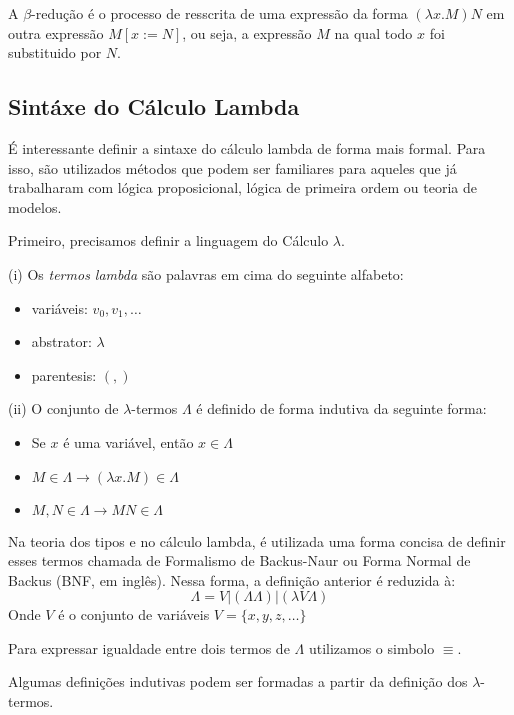 \documentclass[../main.tex]{subfiles}
\begin{document}
\begin{definition}
    A $\beta$-redução é o processo de resscrita de uma expressão da forma $(\lambda x . M)N$ em outra expressão $M[x := N]$, ou seja, a expressão $M$ na qual todo $x$ foi substituido por $N$.    
\end{definition}

\subsection{Sintáxe do Cálculo Lambda}

É interessante definir a sintaxe do cálculo lambda de forma mais formal. Para isso, são utilizados métodos que podem ser familiares para aqueles que já trabalharam com lógica proposicional, lógica de primeira ordem ou teoria de modelos.

Primeiro, precisamos definir a linguagem do Cálculo $\lambda$.

\begin{definition}
    (i) Os \emph{termos lambda} são palavras em cima do seguinte alfabeto:
    \begin{itemize}
        \item variáveis: $v_0, v_1, \dots$ 
        \item abstrator: $\lambda$ 
        \item parentesis: $( , )$ 
    \end{itemize}
    (ii) O conjunto de $\lambda$-termos $\Lambda$ é definido de forma indutiva da seguinte forma:
    \begin{itemize}
        \item Se $x$ é uma variável, então $x \in \Lambda$
        \item $M \in \Lambda \to (\lambda x . M) \in \Lambda$
        \item $M, N \in \Lambda \to M N \in \Lambda$
    \end{itemize}
\end{definition}

Na teoria dos tipos e no cálculo lambda, é utilizada uma forma concisa de definir esses termos chamada de Formalismo de Backus-Naur ou Forma Normal de Backus (BNF, em inglês). Nessa forma, a definição anterior é reduzida à:
$$\Lambda = V | (\Lambda \Lambda) | (\lambda V \Lambda)$$
Onde $V$ é o conjunto de variáveis $V = \{x, y, z, \dots\}$

Para expressar igualdade entre dois termos de $\Lambda$ utilizamos o simbolo $\equiv$.

Algumas definições indutivas podem ser formadas a partir da definição dos $\lambda$-termos.
\end{document}
